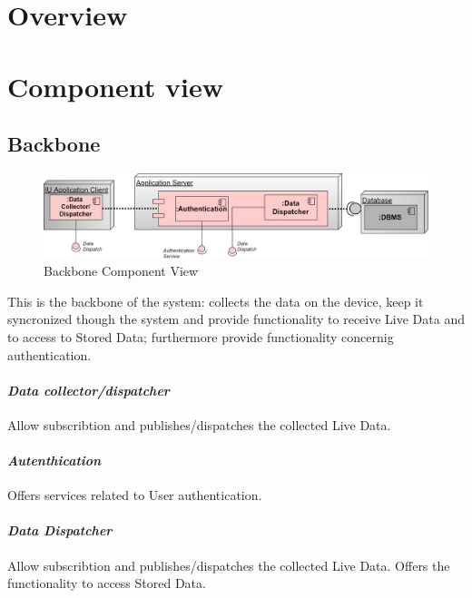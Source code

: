 \section{Overview}
\section{Component view}
\subsection{Backbone}
\begin{figure}[H]
\caption{Backbone Component View}
\includegraphics[width = \textwidth]{sections/architecturalDesign/BackboneDiagram.png}
\end{figure}
This is the backbone of the system: collects the data on the device, keep it syncronized though the system and provide functionality to receive Live Data and to access to Stored Data; furthermore provide functionality concernig authentication.
\paragraph{\textit{Data collector/dispatcher}} Allow subscribtion and publishes/dispatches the collected Live Data. 
\paragraph{\textit{Autenthication}} Offers services related to  User authentication.
\paragraph{\textit{Data Dispatcher}} Allow subscribtion and publishes/dispatches the collected Live Data. Offers the functionality to access Stored Data.
\clearpage
